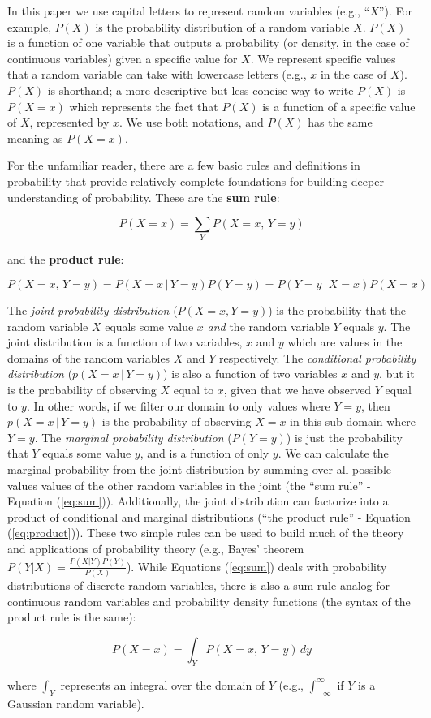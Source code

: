 \documentclass[12pt]{article}
\begin{document}
In this paper we use capital letters to represent random variables
(e.g., ``$X$''). For example, $P(X)$ is the probability distribution
of a random variable $X$. $P(X)$ is a function of one variable that
outputs a probability (or density, in the case of continuous
variables) given a specific value for $X$. We represent specific
values that a random variable can take with lowercase letters (e.g.,
$x$ in the case of $X$). $P(X)$ is shorthand; a more descriptive but
less concise way to write $P(X)$ is $P(X=x)$ which represents the fact
that $P(X)$ is a function of a specific value of $X$, represented by
$x$. We use both notations, and $P(X)$ has the same meaning as
$P(X=x)$.

For the unfamiliar reader, there are a few basic rules and definitions
in probability that provide relatively complete foundations for
building deeper understanding of probability. These are the
\textbf{sum rule}:

\begin{equation} P(X=x) = \sum_Y P(X=x,\, Y=y)
  \label{eq:sum}
\end{equation}

and the \textbf{product rule}:

\begin{equation} P(X=x, \, Y=y) = P(X = x \, | \, Y=y ) P(Y=y) = P(Y =
  y \, | \, X=x ) P(X=x)
  \label{eq:product}
\end{equation}

The \textit{joint probability distribution} ($P(X=x,Y=y)$) is the
probability that the random variable $X$ equals some value $x$
\emph{and} the random variable $Y$ equals $y$. The joint distribution
is a function of two variables, $x$ and $y$ which are values in the
domains of the random variables $X$ and $Y$ respectively. The
\textit{conditional probability distribution} ($p(X = x \, | \, Y=y
)$) is also a function of two variables $x$ and $y$, but it is the
probability of observing $X$ equal to $x$, given that we have observed
$Y$ equal to $y$. In other words, if we filter our domain to only
values where $Y=y$, then $p(X = x \, | \, Y=y )$ is the probability of
observing $X=x$ in this sub-domain where $Y=y$. The \textit{marginal
  probability distribution} ($P(Y=y)$) is just the probability that $Y$
equals some value $y$, and is a function of only $y$. We can calculate
the marginal probability from the joint distribution by summing over
all possible values values of the other random variables in the joint
(the ``sum rule'' - Equation (\ref{eq:sum})). Additionally, the joint
distribution can factorize into a product of conditional and marginal
distributions (``the product rule'' - Equation
(\ref{eq:product})). These two simple rules can be used to build much
of the theory and applications of probability theory (e.g., Bayes'
theorem $P(Y|X) =\frac{P(X|Y) P(Y)}{P(X)}$). While Equations
(\ref{eq:sum}) deals with probability distributions of discrete random
variables, there is also a sum rule analog for continuous random
variables and probability density functions (the syntax of the product
rule is the same):

\begin{equation*} P(X=x) = \int_Y P(X=x,\, Y=y) \, dy
\end{equation*}

where $\int_{Y}$ represents an integral over the domain of $Y$ (e.g.,
$\int_{-\infty}^{\infty}$ if $Y$ is a Gaussian random variable).
\end{document}
